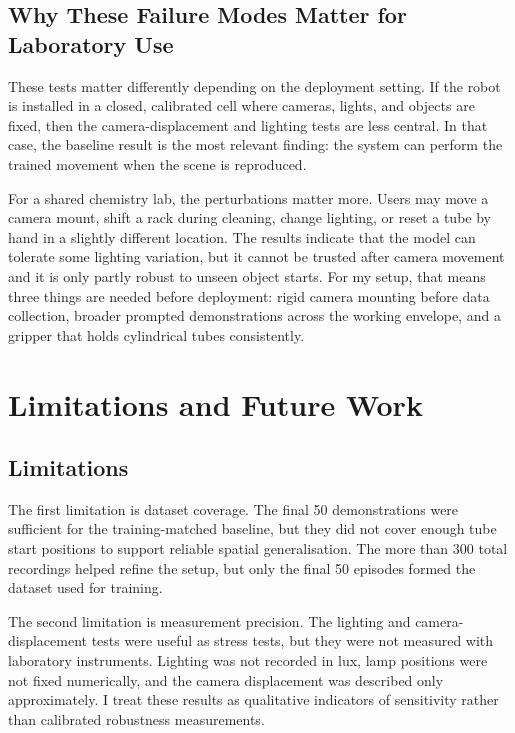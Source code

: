 \documentclass[11pt, a4paper]{article}
\begin{document}
\subsection{Why These Failure Modes Matter for Laboratory Use}

These tests matter differently depending on the deployment setting. If the robot is installed in a closed, calibrated cell where cameras, lights, and objects are fixed, then the camera-displacement and lighting tests are less central. In that case, the baseline result is the most relevant finding: the system can perform the trained movement when the scene is reproduced.

For a shared chemistry lab, the perturbations matter more. Users may move a camera mount, shift a rack during cleaning, change lighting, or reset a tube by hand in a slightly different location. The results indicate that the model can tolerate some lighting variation, but it cannot be trusted after camera movement and it is only partly robust to unseen object starts. For my setup, that means three things are needed before deployment: rigid camera mounting before data collection, broader prompted demonstrations across the working envelope, and a gripper that holds cylindrical tubes consistently.

\section{Limitations and Future Work}
\label{sec:limitations}

\subsection{Limitations}

The first limitation is dataset coverage. The final 50 demonstrations were sufficient for the training-matched baseline, but they did not cover enough tube start positions to support reliable spatial generalisation. The more than 300 total recordings helped refine the setup, but only the final 50 episodes formed the dataset used for training.

The second limitation is measurement precision. The lighting and camera-displacement tests were useful as stress tests, but they were not measured with laboratory instruments. Lighting was not recorded in lux, lamp positions were not fixed numerically, and the camera displacement was described only approximately. I treat these results as qualitative indicators of sensitivity rather than calibrated robustness measurements.
\end{document}
